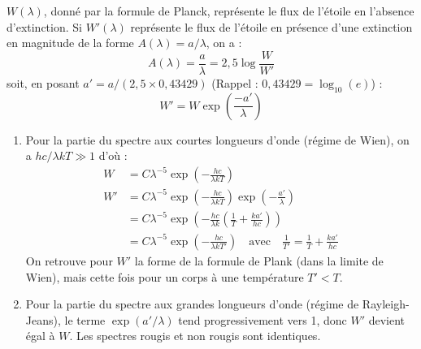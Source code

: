 \documentclass[a4paper,10pt]{report}
\begin{document}
\begin{Answer}
  $W(\lambda)$, donné par la formule de Planck, représente le flux de
  l'étoile en l'absence d'extinction.  Si $W'(\lambda)$ représente le
  flux de l'étoile en présence d'une extinction en magnitude de la
  forme $A(\lambda) = a/\lambda$, on a :
  $$
  A(\lambda)= \frac{a}{\lambda} = 2,5 \log\frac{W}{W'}
  $$
  soit, en posant $a' = a/(2,5 \times 0,43429)$ (Rappel : $0,43429 =
  \log_{10}(e)$) :
  $$
  W' = W \exp\left(\frac{-a'}{\lambda}\right)
  $$

  \begin{enumerate}
  \item Pour la partie du spectre aux courtes longueurs d'onde (régime
    de Wien), on a $hc/\lambda kT \gg 1$ d'où :
    \begin{align*}
      W  &= C\lambda^{-5}\exp\left(-\frac{hc}{\lambda kT}\right) \\
      W' &= C\lambda^{-5}\exp\left(-\frac{hc}{\lambda kT}\right)
      \exp\left(-\frac{a'}{\lambda}\right) \\
      &= C\lambda^{-5}\exp\left(-\frac{hc}{\lambda k}
        \left(\frac{1}{T}+\frac{ka'}{hc}\right)\right) \\
      &= C\lambda^{-5}\exp\left(-\frac{hc}{\lambda kT'}\right)
      \quad\text{avec}\quad
      \frac{1}{T'} = \frac{1}{T} + \frac{ka'}{hc}
    \end{align*}
    On retrouve pour $W'$ la forme de la formule de Plank (dans la
    limite de Wien), mais cette fois pour un corps à une température
    $T' < T$.

  \item Pour la partie du spectre aux grandes longueurs d'onde (régime
    de Rayleigh-Jeans), le terme $\exp(a'/\lambda)$ tend
    progressivement vers 1, donc $W'$ devient égal à $W$. Les spectres
    rougis et non rougis sont identiques.
  \end{enumerate}
\end{Answer}
\end{document}
